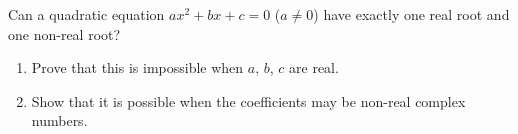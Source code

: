 Can a quadratic equation $ax^2+bx+c=0$ ($a\ne0$) have exactly one real root and one non-real root?
\begin{enumerate}
\item[(a)] Prove that this is impossible when $a$, $b$, $c$ are real.
\item[(b)] Show that it is possible when the coefficients may be non-real complex numbers.
\end{enumerate}
